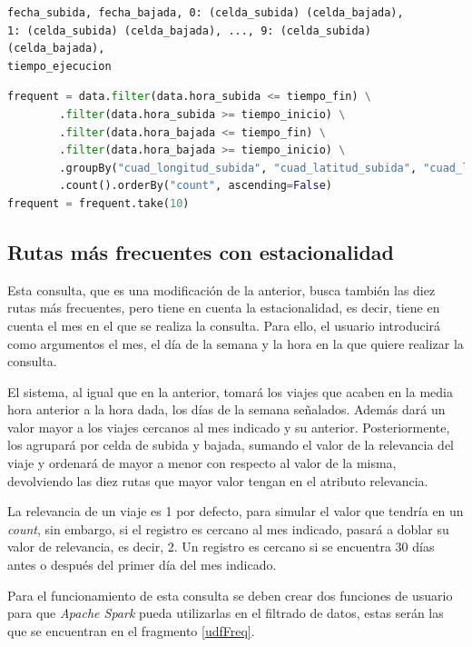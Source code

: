 \begin{verbatim}
fecha_subida, fecha_bajada, 0: (celda_subida) (celda_bajada),
1: (celda_subida) (celda_bajada), ..., 9: (celda_subida) (celda_bajada),
tiempo_ejecucion
\end{verbatim}

\begin{lstlisting}[label=codFreq,language=Python,frame=single,caption=Consulta diez rutas más frecuentes]
frequent = data.filter(data.hora_subida <= tiempo_fin) \
        .filter(data.hora_subida >= tiempo_inicio) \
        .filter(data.hora_bajada <= tiempo_fin) \
        .filter(data.hora_bajada >= tiempo_inicio) \
        .groupBy("cuad_longitud_subida", "cuad_latitud_subida", "cuad_longitud_bajada", "cuad_latitud_bajada") \
        .count().orderBy("count", ascending=False)
frequent = frequent.take(10)
\end{lstlisting}

\subsection{Rutas más frecuentes con estacionalidad}
Esta consulta, que es una modificación de la anterior, busca también las diez rutas más frecuentes, pero tiene en cuenta la estacionalidad, es decir, tiene en cuenta el mes en el que se realiza la consulta. Para ello, el usuario introducirá como argumentos el mes, el día de la semana y la hora en la que quiere realizar la consulta.

El sistema, al igual que en la anterior, tomará los viajes que acaben en la media hora anterior a la hora dada, los días de la semana señalados. Además dará un valor mayor a los viajes cercanos al mes indicado y su anterior. Posteriormente, los agrupará por celda de subida y bajada, sumando el valor de la relevancia del viaje y ordenará de mayor a menor con respecto al valor de la misma, devolviendo las diez rutas que mayor valor tengan en el atributo relevancia.

La relevancia de un viaje es 1 por defecto, para simular el valor que tendría en un \textit{count}, sin embargo, si el registro es cercano al mes indicado, pasará a doblar su valor de relevancia, es decir, 2. Un registro es cercano si se encuentra 30 días antes o después del primer día del mes indicado.

Para el funcionamiento de esta consulta se deben crear dos funciones de usuario para que \textit{Apache Spark} pueda utilizarlas en el filtrado de datos, estas serán las que se encuentran en el fragmento \ref{udfFreq}.

